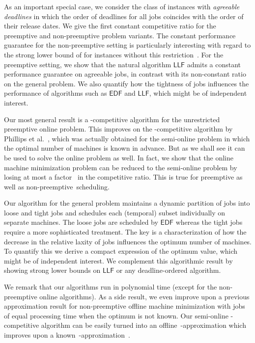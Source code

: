 \documentclass[letterpaper,11pt]{article}
\newcommand{\EDF}{\ensuremath{\mathsf{EDF}}\xspace}
\newcommand{\LLF}{\ensuremath{\mathsf{LLF}}\xspace}
\begin{document}
As an important special case, we consider the class of instances
with  {\em agreeable deadlines} in which the order of deadlines for all jobs coincides with the order of
their release dates. We give the first constant competitive
ratio for the preemptive and non-preemptive problem variants.
The constant performance guarantee for the non-preemptive
setting is particularly interesting with regard to the strong lower bound of
 for instances without this restriction~\cite{Saha13}. For the preemptive setting, we show that the natural algorithm \LLF admits a constant performance guarantee on agreeable jobs, in contrast with its non-constant ratio on the general problem. We also quantify how the tightness of jobs influences the performance
of algorithms such as \EDF and \LLF, which might be of independent interest.



Our most general result is a -competitive algorithm for the unrestricted preemptive online
problem. This improves on the -competitive algorithm by Phillips et
al.~\cite{phillipsSTW02,phillipsSTW97}, which was actually
obtained for the semi-online problem in which the optimal
number of machines is known in advance. But as we shall see it can be
used to solve the online problem as well. In fact, we show that the
online machine minimization problem can be reduced to the semi-online
problem by losing at most a factor~ in the competitive ratio. This
is true for preemptive as well as non-preemptive~scheduling.

Our algorithm for the general problem maintains a dynamic partition of jobs into
loose and tight jobs and schedules each (temporal) subset
individually on separate machines. The loose jobs are scheduled
by \EDF whereas the tight jobs require a more sophisticated
treatment. The key is a characterization of how the decrease in the
relative laxity of jobs influences the optimum number of machines. To
quantify this we derive a compact expression of the optimum value,
which might be of independent interest. 
We complement this algorithmic result by showing strong lower bounds on \LLF or any deadline-ordered algorithm. 

We remark that our algorithms run in polynomial time (except for the non-preemptive online algorithms). As a side
result, we even improve upon a previous approximation result for
non-preemptive offline machine minimization with jobs of equal processing time when the optimum is not
known. Our semi-online -competitive algorithm can be easily turned into an offline~-approximation which
improves upon a known~-approximation~\cite{YuZ09}.
\end{document}
